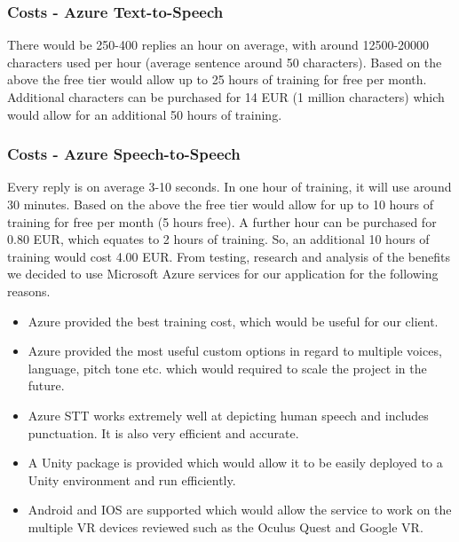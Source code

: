 \subsubsection{Costs - Azure Text-to-Speech}
There would be 250-400 replies an hour on average, with around 12500-20000 characters used per hour (average sentence around 50 characters). Based on the above the free tier would allow up to 25 hours of training for free per month. Additional characters can be purchased for 14 EUR (1 million characters) which would allow for an additional 50 hours of training.

\subsubsection{Costs - Azure Speech-to-Speech}
Every reply is on average 3-10 seconds. In one hour of training, it will use around 30 minutes. Based on the above the free tier would allow for up to 10 hours of training for free per month (5 hours free). A further hour can be purchased for 0.80 EUR, which equates to 2 hours of training. So, an additional 10 hours of training would cost 4.00 EUR.
\newline\newline
From testing, research and analysis of the benefits we decided to use Microsoft Azure services for our application for the following reasons.

\begin{itemize}
  \item Azure provided the best training cost, which would be useful for our client.
  \item Azure provided the most useful custom options in regard to multiple voices, language, pitch tone etc. which would required to scale the project in the future.
  \item Azure STT works extremely well at depicting human speech and includes punctuation. It is also very efficient and accurate.
  \item A Unity package is provided which would allow it to be easily deployed to a Unity environment and run efficiently.
  \item Android and IOS are supported which would allow the service to work on the multiple VR devices reviewed such as the Oculus Quest and Google VR.
\end{itemize}

